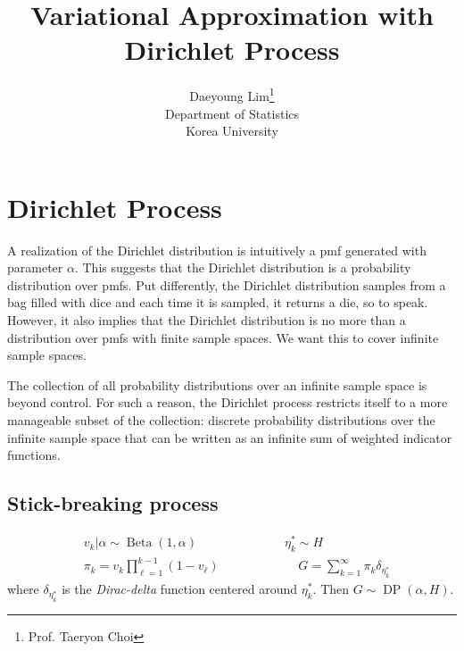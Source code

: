 \documentclass[11pt]{article}
\newcommand{\opn}{\operatorname}
\begin{document}
\nocite{*}

\title{Variational Approximation with Dirichlet Process}

\author{Daeyoung Lim\thanks{Prof. Taeryon Choi} \\
Department of Statistics \\
Korea University}

\maketitle

\section{Dirichlet Process}
A realization of the Dirichlet distribution is intuitively a pmf generated with parameter $\alpha$. This suggests that the Dirichlet distribution is a probability distribution over pmfs. Put differently, the Dirichlet distribution samples from a bag filled with dice and each time it is sampled, it returns a die, so to speak. However, it also implies that the Dirichlet distribution is no more than a distribution over pmfs with finite sample spaces. We want this to cover infinite sample spaces. \par
The collection of all probability distributions over an infinite sample space is beyond control. For such a reason, the Dirichlet process restricts itself to a more manageable subset of the collection: discrete probability distributions over the infinite sample space that can be written as an infinite sum of weighted indicator functions.
\subsection{Stick-breaking process}
\begin{align*}
  &v_{k}|\alpha \sim \opn{Beta}\left(1, \alpha \right) \quad \quad \quad \quad\quad \quad\quad \eta_{k}^{*} \sim H \\
  & \pi_{k} = v_{k}\prod_{\ell=1}^{k-1}\left(1-v_{\ell} \right) \quad \quad \quad \quad\quad \quad \,\,  G = \sum_{k=1}^{\infty} \pi_{k}\delta_{\eta_{k}^{*}}
\end{align*} 
where $\delta_{\eta_{k}^{*}}$ is the \emph{Dirac-delta} function centered around $\eta_{k}^{*}$. Then $G \sim \opn{DP}\left(\alpha, H \right)$.
\end{document}
